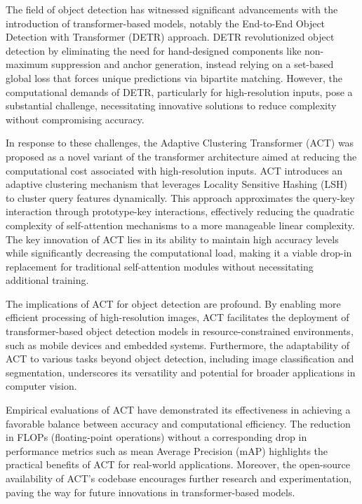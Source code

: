 \documentclass[a4paper]{article}
\begin{document}
The field of object detection has witnessed significant advancements with the introduction of transformer-based models, notably the End-to-End Object Detection with Transformer (DETR) approach. DETR revolutionized object detection by eliminating the need for hand-designed components like non-maximum suppression and anchor generation, instead relying on a set-based global loss that forces unique predictions via bipartite matching. However, the computational demands of DETR, particularly for high-resolution inputs, pose a substantial challenge, necessitating innovative solutions to reduce complexity without compromising accuracy.

In response to these challenges, the Adaptive Clustering Transformer (ACT) was proposed as a novel variant of the transformer architecture aimed at reducing the computational cost associated with high-resolution inputs. ACT introduces an adaptive clustering mechanism that leverages Locality Sensitive Hashing (LSH) to cluster query features dynamically. This approach approximates the query-key interaction through prototype-key interactions, effectively reducing the quadratic complexity of self-attention mechanisms to a more manageable linear complexity. The key innovation of ACT lies in its ability to maintain high accuracy levels while significantly decreasing the computational load, making it a viable drop-in replacement for traditional self-attention modules without necessitating additional training.

The implications of ACT for object detection are profound. By enabling more efficient processing of high-resolution images, ACT facilitates the deployment of transformer-based object detection models in resource-constrained environments, such as mobile devices and embedded systems. Furthermore, the adaptability of ACT to various tasks beyond object detection, including image classification and segmentation, underscores its versatility and potential for broader applications in computer vision.

Empirical evaluations of ACT have demonstrated its effectiveness in achieving a favorable balance between accuracy and computational efficiency. The reduction in FLOPs (floating-point operations) without a corresponding drop in performance metrics such as mean Average Precision (mAP) highlights the practical benefits of ACT for real-world applications. Moreover, the open-source availability of ACT's codebase encourages further research and experimentation, paving the way for future innovations in transformer-based models.
\end{document}
